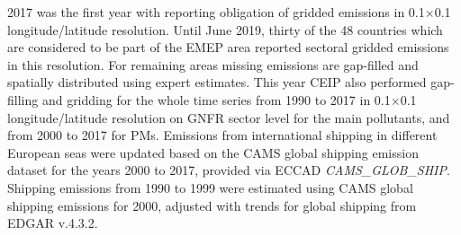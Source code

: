 2017 was the first year with reporting obligation of gridded emissions in  0.1{\degrees}$\times$0.1{\degrees} lon\-gi\-tude/la\-ti\-tude resolution. 
Until June 2019, thirty of the 48 countries which are considered to be part of the EMEP area reported sectoral gridded emissions in this resolution. %
For remaining areas missing emissions are gap-filled and spatially distributed using expert estimates. This year CEIP also performed gap-filling and gridding for the whole time series from 1990 to 2017 in 0.1{\degrees}$\times$0.1{\degrees} lon\-gi\-tude/la\-ti\-tude resolution on GNFR sector level for the main pollutants, and from 2000 to 2017 for PMs.
Emissions from international shipping in different European seas were updated based on the CAMS global shipping emission dataset for the years 2000 to 2017, provided via ECCAD {\it CAMS\_GLOB\_SHIP}. Shipping emissions from 1990 to 1999 were estimated using CAMS global shipping emissions for 2000, adjusted with trends for global shipping from EDGAR v.4.3.2.


